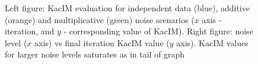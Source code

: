 \documentclass{article}
\begin{document}
{\begin{figure}%
	\centering
	\qquad
	\caption{Left figure: KacIM evaluation for independent data (blue), additive (orange) and multiplicative (green) noise scenarios ($x$ axis - iteration, and $y$ - corresponding value of KacIM). Right figure: noise level ($x$ axis) vs final iteration KacIM value ($y$ axis). KacIM values for larger noise levels saturates as in tail of graph}
	\label{fig:experiments_simulation}
\end{figure}

}
\end{document}
